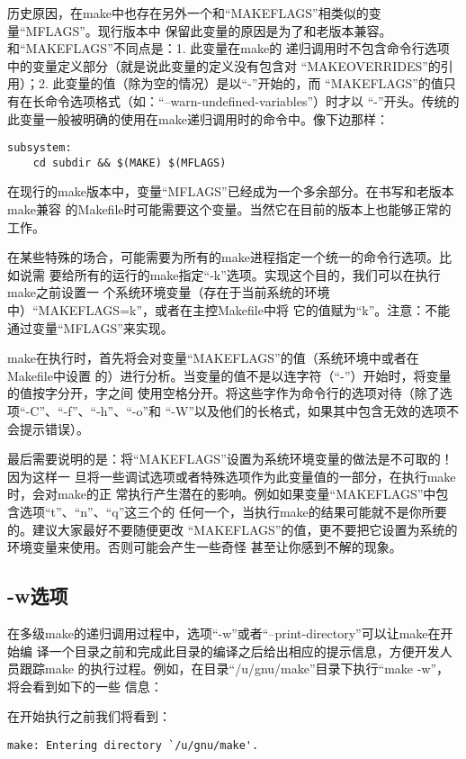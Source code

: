 历史原因，在make中也存在另外一个和“MAKEFLAGS”相类似的变量“MFLAGS”。现行版本中
保留此变量的原因是为了和老版本兼容。和“MAKEFLAGS”不同点是：1. 此变量在make的
递归调用时不包含命令行选项中的变量定义部分（就是说此变量的定义没有包含对
“MAKEOVERRIDES”的引用）；2. 此变量的值（除为空的情况）是以“-”开始的，而
“MAKEFLAGS”的值只有在长命令选项格式（如：“--warn-undefined-variables”）时才以
“-”开头。传统的此变量一般被明确的使用在make递归调用时的命令中。像下边那样：
\begin{Verbatim}[]
subsystem:
    cd subdir && $(MAKE) $(MFLAGS)
\end{Verbatim}

在现行的make版本中，变量“MFLAGS”已经成为一个多余部分。在书写和老版本make兼容
的Makefile时可能需要这个变量。当然它在目前的版本上也能够正常的工作。

在某些特殊的场合，可能需要为所有的make进程指定一个统一的命令行选项。比如说需
要给所有的运行的make指定“-k”选项。实现这个目的，我们可以在执行make之前设置一
个系统环境变量（存在于当前系统的环境中）“MAKEFLAGS=k”，或者在主控Makefile中将
它的值赋为“k”。注意：不能通过变量“MFLAGS”来实现。

make在执行时，首先将会对变量“MAKEFLAGS”的值（系统环境中或者在Makefile中设置
的）进行分析。当变量的值不是以连字符（“-”）开始时，将变量的值按字分开，字之间
使用空格分开。将这些字作为命令行的选项对待（除了选项“-C”、“-f”、“-h”、“-o”和
“-W”以及他们的长格式，如果其中包含无效的选项不会提示错误）。

最后需要说明的是：将“MAKEFLAGS”设置为系统环境变量的做法是不可取的！因为这样一
旦将一些调试选项或者特殊选项作为此变量值的一部分，在执行make时，会对make的正
常执行产生潜在的影响。例如如果变量“MAKEFLAGS”中包含选项“t”、“n”、“q”这三个的
任何一个，当执行make的结果可能就不是你所要的。建议大家最好不要随便更改
“MAKEFLAGS”的值，更不要把它设置为系统的环境变量来使用。否则可能会产生一些奇怪
甚至让你感到不解的现象。

\subsection{-w选项}

在多级make的递归调用过程中，选项“-w”或者“--print-directory”可以让make在开始编%
\pagebreak[2]
译一个目录之前和完成此目录的编译之后给出相应的提示信息，方便开发人员跟踪make%
的执行过程。例如，在目录“/u/gnu/make”目录下执行“make -w”，将会看到如下的一些%
信息：%

\noindent
在开始执行之前我们将看到：
\begin{Verbatim}[]
make: Entering directory `/u/gnu/make'.
\end{Verbatim}

